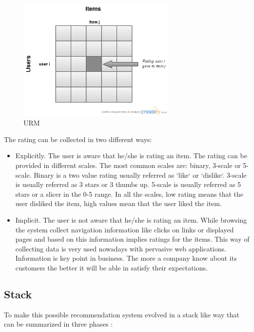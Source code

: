 \begin{itemize}
  \begin{figure}
    \centering
    \includegraphics[width=0.7\textwidth]{figures/URM.png}
    \caption{URM}
    \label{fig:URM}
  \end{figure}

The rating can be collected in two different ways:

\begin{itemize}
\item Explicitly. The user is aware that he/she is rating an item. The rating can be provided in different scales. The most common scales are: binary, 3-scale or 5-scale. Binary is a two value rating usually referred as `like` or `dislike`. 3-scale is usually referred as 3 stars or 3 thumbs up. 5-scale is usually referred as 5 stars or a slicer in the 0-5 range. In all the scales, low rating means that the user disliked the item, high values mean that the user liked the item.
\item Implicit. The user is not aware that he/she is rating an item. While browsing the system collect navigation information like clicks on links or displayed pages and based on this information implies ratings for the items. This way of collecting data is very used nowadays with pervasive web applications. Information is key point in business. The more a company know about its customers the better it will be able in satisfy their expectations. 
\end{itemize}
\end{itemize}

\subsection{Stack}
\label{sec:Stack}

To make this possible recommendation system evolved in a stack like way that can be summarized in three phases \cite{sys-rec-matlab}:


